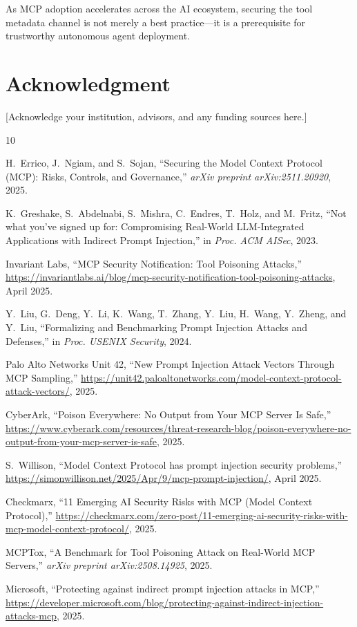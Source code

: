 \documentclass[conference]{IEEEtran}
\begin{document}
As MCP adoption accelerates across the AI ecosystem, securing the tool metadata channel is not merely a best practice—it is a prerequisite for trustworthy autonomous agent deployment.

\section*{Acknowledgment}

[Acknowledge your institution, advisors, and any funding sources here.]



\begin{thebibliography}{10}

H.~Errico, J.~Ngiam, and S.~Sojan, ``Securing the Model Context Protocol (MCP): Risks, Controls, and Governance,'' \textit{arXiv preprint arXiv:2511.20920}, 2025.

K.~Greshake, S.~Abdelnabi, S.~Mishra, C.~Endres, T.~Holz, and M.~Fritz, ``Not what you've signed up for: Compromising Real-World LLM-Integrated Applications with Indirect Prompt Injection,'' in \textit{Proc. ACM AISec}, 2023.

Invariant Labs, ``MCP Security Notification: Tool Poisoning Attacks,'' \url{https://invariantlabs.ai/blog/mcp-security-notification-tool-poisoning-attacks}, April 2025.

Y.~Liu, G.~Deng, Y.~Li, K.~Wang, T.~Zhang, Y.~Liu, H.~Wang, Y.~Zheng, and Y.~Liu, ``Formalizing and Benchmarking Prompt Injection Attacks and Defenses,'' in \textit{Proc. USENIX Security}, 2024.

Palo Alto Networks Unit 42, ``New Prompt Injection Attack Vectors Through MCP Sampling,'' \url{https://unit42.paloaltonetworks.com/model-context-protocol-attack-vectors/}, 2025.

CyberArk, ``Poison Everywhere: No Output from Your MCP Server Is Safe,'' \url{https://www.cyberark.com/resources/threat-research-blog/poison-everywhere-no-output-from-your-mcp-server-is-safe}, 2025.

S.~Willison, ``Model Context Protocol has prompt injection security problems,'' \url{https://simonwillison.net/2025/Apr/9/mcp-prompt-injection/}, April 2025.

Checkmarx, ``11 Emerging AI Security Risks with MCP (Model Context Protocol),'' \url{https://checkmarx.com/zero-post/11-emerging-ai-security-risks-with-mcp-model-context-protocol/}, 2025.

MCPTox, ``A Benchmark for Tool Poisoning Attack on Real-World MCP Servers,'' \textit{arXiv preprint arXiv:2508.14925}, 2025.

Microsoft, ``Protecting against indirect prompt injection attacks in MCP,'' \url{https://developer.microsoft.com/blog/protecting-against-indirect-injection-attacks-mcp}, 2025.

\end{thebibliography}
\end{document}
